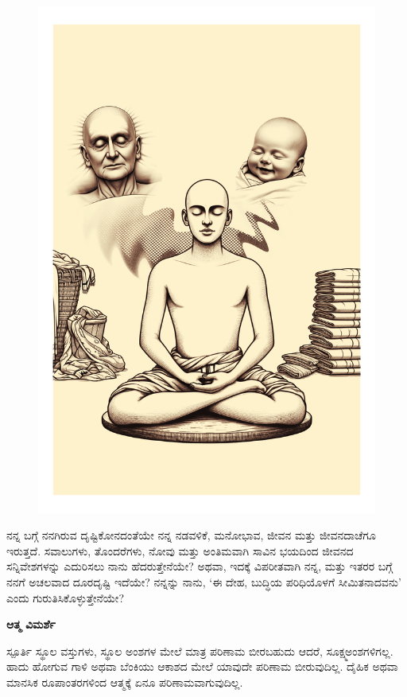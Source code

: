 \thispagestyle{empty}
\begin{figure}
\centering
\includegraphics[width=\paperwidth, height=\paperheight, keepaspectratio]{./images/002.jpg}
\end{figure}
\restoregeometry %
\newpage

\begin{mananam}{}
\small \mananatext ನನ್ನ ಬಗ್ಗೆ ನನಗಿರುವ ದೃಷ್ಟಿಕೋನದಂತೆಯೇ ನನ್ನ ನಡವಳಿಕೆ, ಮನೋಭಾವ, ಜೀವನ ಮತ್ತು ಜೀವನದಾಚೆಗೂ  ಇರುತ್ತದೆ. ಸವಾಲುಗಳು, ತೊಂದರೆಗಳು, ನೋವು ಮತ್ತು ಅಂತಿಮವಾಗಿ ಸಾವಿನ ಭಯದಿಂದ ಜೀವನದ ಸನ್ನಿವೇಶಗಳನ್ನು ಎದುರಿಸಲು ನಾನು ಹೆದರುತ್ತೇನೆಯೇ? ಅಥವಾ, ಇದಕ್ಕೆ ವಿಪರೀತವಾಗಿ ನನ್ನ, ಮತ್ತು ಇತರರ ಬಗ್ಗೆ ನನಗೆ ಅಚಲವಾದ ದೂರದೃಷ್ಟಿ ಇದೆಯೇ?  ನನ್ನನ್ನು ನಾನು, ‘ಈ ದೇಹ, ಬುದ್ಧಿಯ ಪರಿಧಿಯೊಳಗೆ ಸೀಮಿತನಾದವನು’ ಎಂದು ಗುರುತಿಸಿಕೊಳ್ಳುತ್ತೇನೆಯೇ? 
\end{mananam}
\WritingHand\enspace\textbf{ಆತ್ಮ ವಿಮರ್ಶೆ}
\begin{inspiration}{\mananamfont ಸ್ಪೂರ್ತಿ}
\small \mananatext ಸ್ಥೂಲ ವಸ್ತುಗಳು, ಸ್ಥೂಲ ಅಂಶಗಳ ಮೇಲೆ ಮಾತ್ರ ಪರಿಣಾಮ ಬೀರಬಹುದು ಆದರೆ, ಸೂಕ್ಷ್ಮಅಂಶಗಳಿಗಲ್ಲ. ಹಾದು ಹೋಗುವ ಗಾಳಿ ಅಥವಾ ಬೆಂಕಿಯು ಆಕಾಶದ ಮೇಲೆ ಯಾವುದೇ ಪರಿಣಾಮ ಬೀರುವುದಿಲ್ಲ. ದೈಹಿಕ ಅಥವಾ ಮಾನಸಿಕ ರೂಪಾಂತರಗಳಿಂದ ಆತ್ಮಕ್ಕೆ ಏನೂ ಪರಿಣಾಮವಾಗುವುದಿಲ್ಲ.
\end{inspiration}
\newpage

